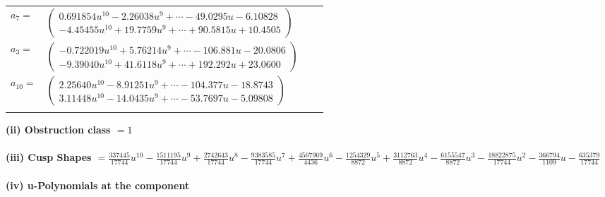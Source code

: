 \documentclass[1p]{elsarticle_modified}
\theoremstyle{definition}
\begin{document}
\begin{tabular}{m{7pt} m{180pt} m{7pt} m{180pt} }
\flushright $a_{7}=$&$\begin{pmatrix}0.691854 u^{10}-2.26038 u^{9}+\cdots-49.0295 u-6.10828\\-4.45455 u^{10}+19.7759 u^{9}+\cdots+90.5815 u+10.4505\end{pmatrix}$ \\
\flushright $a_{3}=$&$\begin{pmatrix}-0.722019 u^{10}+5.76214 u^{9}+\cdots-106.881 u-20.0806\\-9.39040 u^{10}+41.6118 u^{9}+\cdots+192.292 u+23.0600\end{pmatrix}$ \\
\flushright $a_{10}=$&$\begin{pmatrix}2.25640 u^{10}-8.91251 u^{9}+\cdots-104.377 u-18.8743\\3.11448 u^{10}-14.0435 u^{9}+\cdots-53.7697 u-5.09808\end{pmatrix}$\\&\end{tabular}
\flushleft \textbf{(ii) Obstruction class $= 1$}\\~\\
\flushleft \textbf{(iii) Cusp Shapes $= \frac{337445}{17744} u^{10}-\frac{1511195}{17744} u^9+\frac{2742643}{17744} u^8-\frac{9383585}{17744} u^7+\frac{4567969}{4436} u^6-\frac{1254329}{8872} u^5+\frac{3112763}{8872} u^4-\frac{6155547}{8872} u^3-\frac{18822875}{17744} u^2-\frac{366794}{1109} u-\frac{635379}{17744}$}\\~\\
\newpage\renewcommand{\arraystretch}{1}
\flushleft \textbf{(iv) u-Polynomials at the component}\newline \\
\end{document}
